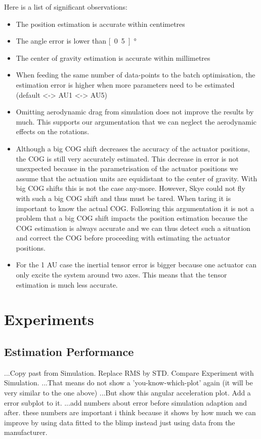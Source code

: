 Here is a list of significant observations:
\begin{itemize}
\item The position estimation is accurate within centimetres
\item The angle error is lower than \unit[0.5]{°}
\item The center of gravity estimation is accurate within millimetres
\item When feeding the same number of data-points to the batch optimisation, the estimation error is higher when more parameters need to be estimated (default <-> AU1 <-> AU5)
\item Omitting aerodynamic drag from simulation does not improve the results by much. This supports our argumentation that we can neglect the aerodynamic effects on the rotations.
\item Although a big COG shift decreases the accuracy of the actuator positions, the COG is still very accurately estimated. This decrease in error is not unexpected because in the parametrisation of the actuator positions we assume that the actuation units are equidistant to the center of gravity. With big COG shifts this is not the case any-more. However, Skye could not fly with such a big COG shift and thus must be tared. When taring it is important to know the actual COG. Following this argumentation it is not a problem that a big COG shift impacts the position estimation because the COG estimation is always accurate and we can thus detect such a situation and correct the COG before proceeding with estimating the actuator positions.
\item For the 1 AU case the inertial tensor error is bigger because one actuator can only excite the system around two axes. This means that the tensor estimation is much less accurate.
\end{itemize}


\section{Experiments}
\subsection{Estimation Performance}
...Copy past from Simulation. Replace RMS by STD. Compare Experiment with Simulation.
...That means do not show a 'you-know-which-plot' again (it will be very similar to the one above)
...But show this angular acceleration plot. Add a error subplot to it.
...add numbers about error before simulation adaption and after. these numbers are important i think because it shows by how much we can improve by using data fitted to the blimp instead just using data from the manufacturer.
